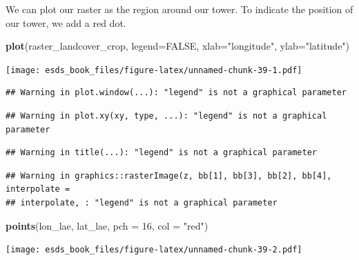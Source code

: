 \documentclass[
]{book}
\newenvironment{Shaded}{\begin{snugshade}}{\end{snugshade}}
\newcommand{\DataTypeTok}[1]{\textcolor[rgb]{0.13,0.29,0.53}{#1}}
\newcommand{\DecValTok}[1]{\textcolor[rgb]{0.00,0.00,0.81}{#1}}
\newcommand{\KeywordTok}[1]{\textcolor[rgb]{0.13,0.29,0.53}{\textbf{#1}}}
\newcommand{\NormalTok}[1]{#1}
\newcommand{\OtherTok}[1]{\textcolor[rgb]{0.56,0.35,0.01}{#1}}
\newcommand{\StringTok}[1]{\textcolor[rgb]{0.31,0.60,0.02}{#1}}
\begin{document}
We can plot our raster as the region around our tower. To indicate the position of our tower, we add a red dot.

\begin{Shaded}
\begin{Highlighting}[]
\KeywordTok{plot}\NormalTok{(raster_landcover_crop, }\DataTypeTok{legend=}\OtherTok{FALSE}\NormalTok{, }\DataTypeTok{xlab=}\StringTok{"longitude"}\NormalTok{, }\DataTypeTok{ylab=}\StringTok{"latitude"}\NormalTok{)}
\end{Highlighting}
\end{Shaded}

\texttt{[image: esds\_book\_files/figure-latex/unnamed-chunk-39-1.pdf]}

\begin{verbatim}
## Warning in plot.window(...): "legend" is not a graphical parameter
\end{verbatim}

\begin{verbatim}
## Warning in plot.xy(xy, type, ...): "legend" is not a graphical parameter
\end{verbatim}

\begin{verbatim}
## Warning in title(...): "legend" is not a graphical parameter
\end{verbatim}

\begin{verbatim}
## Warning in graphics::rasterImage(z, bb[1], bb[3], bb[2], bb[4], interpolate =
## interpolate, : "legend" is not a graphical parameter
\end{verbatim}

\begin{Shaded}
\begin{Highlighting}[]
\KeywordTok{points}\NormalTok{(lon_lae, lat_lae, }\DataTypeTok{pch =} \DecValTok{16}\NormalTok{, }\DataTypeTok{col =} \StringTok{"red"}\NormalTok{)}
\end{Highlighting}
\end{Shaded}

\texttt{[image: esds\_book\_files/figure-latex/unnamed-chunk-39-2.pdf]}
\end{document}
